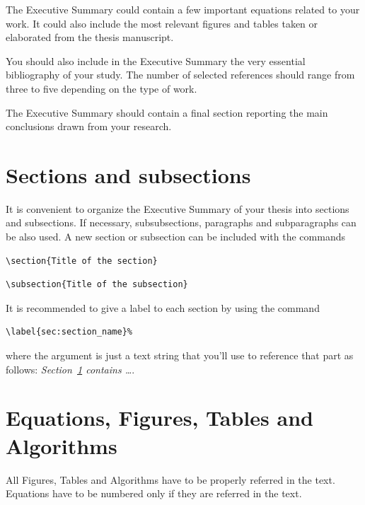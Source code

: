\documentclass[11pt,a4paper,twocolumn]{article}
\begin{document}
The Executive Summary could contain a few important equations related to your work.
It could also include the most relevant figures and tables taken or elaborated from the thesis manuscript.

You should also include in the Executive Summary the very essential bibliography of your study.
The number of selected references should range from three to five depending on the type of work.

The Executive Summary should contain a final section reporting the main conclusions drawn from your research.

\section{Sections and subsections}
\label{sec:sec_and_subsec}
It is convenient to organize the Executive Summary of your thesis into sections and subsections. 
If necessary, subsubsections, paragraphs and subparagraphs can be also used. 
A new section or subsection can be included  with the commands
\begin{verbatim}
\section{Title of the section}
\end{verbatim}
\begin{verbatim}
\subsection{Title of the subsection}
\end{verbatim}
It is recommended to give a label to each section by using the command
\begin{verbatim}
\label{sec:section_name}%
\end{verbatim}
where the argument is just a text string that you'll use to reference that part
as follows: \textit{Section~\ref{sec:sec_and_subsec} contains   \dots}.\\

\section{Equations, Figures, Tables and Algorithms}
\label{sec:equations_and_figures}
All Figures, Tables and Algorithms have to be properly referred in the text.
Equations have to be numbered only if they are referred in the text.
\end{document}
